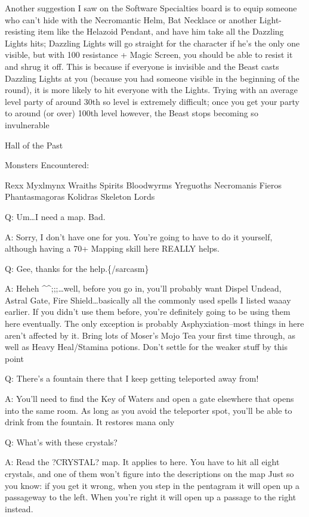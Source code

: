 \documentclass[12pt]{article}
\begin{document}
Another suggestion I saw on the Software Specialties board is to equip
someone who can't hide with the Necromantic Helm, Bat Necklace or another
Light-resisting item like the Helazoid Pendant, and have him take all the
Dazzling Lights hits; Dazzling Lights will go straight for the character if
he's the only one visible, but with 100%
resistance + Magic Screen, you should be able to resist it and shrug it off.
This is because if everyone is invisible and the Beast casts Dazzling Lights
at you (because you had someone visible in the beginning of the round), it is
more likely to hit everyone with the Lights.  Trying with an average level
party of around 30th so level is extremely difficult; once you get your party
to around (or over) 100th level however, the Beast stops becoming so
invulnerable


Hall of the Past

Monsters Encountered:

Rexx Myxlmynx Wraiths Spirits Bloodwyrms Yreguoths Necromanis Fieros
Phantasmagoras Kolidras Skeleton Lords

Q: Um\ldots{}I need a map. Bad.

A: Sorry, I don't have one for you. You're going to have to do it
yourself, although having a 70+ Mapping skill here REALLY helps.

Q: Gee, thanks for the help.\{/sarcasm\}

A: Heheh \^{}\^{};;;\ldots{}well, before you go in, you'll probably want
Dispel Undead, Astral Gate, Fire Shield\ldots{}basically all the
commonly used spells I listed waaay earlier. If you didn't use them
before, you're definitely going to be using them here eventually. The
only exception is probably Asphyxiation--most things in here aren't
affected by it. Bring lots of Moser's Mojo Tea your first time through,
as well as Heavy Heal/Stamina potions. Don't settle for the weaker stuff
by this point

Q: There's a fountain there that I keep getting teleported away from!

A: You'll need to find the Key of Waters and open a gate elsewhere that
opens into the same room. As long as you avoid the teleporter spot,
you'll be able to drink from the fountain. It restores mana only

Q: What's with these crystals?

A: Read the ?CRYSTAL? map. It applies to here. You have to hit all eight
crystals, and one of them won't figure into the descriptions on the map
Just so you know: if you get it wrong, when you step in the pentagram it
will open up a passageway to the left. When you're right it will open up
a passage to the right instead.
\end{document}
